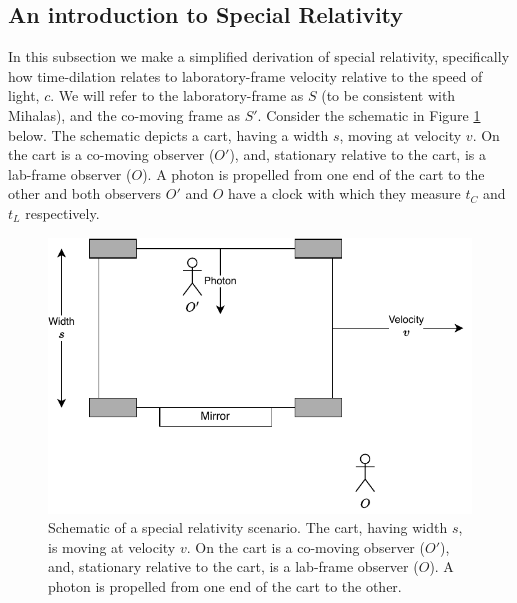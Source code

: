\documentclass[10pt,letterpaper,notitlepage]{article}
\numberwithin{equation}{section}
\begin{document}
\subsection{An introduction to Special Relativity}
In this subsection we make a simplified derivation of special relativity, specifically how time-dilation relates to laboratory-frame velocity relative to the speed of light, $c$. We will refer to the laboratory-frame as $S$ (to be consistent with Mihalas\cite{Mihalas}), and the co-moving frame as $S'$. Consider the schematic in Figure \ref{fig:relativitydiag1} below. The schematic depicts a cart, having a width $s$, moving at velocity $v$. On the cart is a co-moving observer ($O'$), and, stationary relative to the cart, is a lab-frame observer ($O$). A photon is propelled from one end of the cart to the other and both observers $O'$ and $O$ have a clock with which they measure $t_C$ and $t_L$ respectively.
\begin{figure}[H]
	\centering
	\includegraphics[width=0.7\linewidth]{figures/RelativityDiag1.drawio.pdf}
	\caption{Schematic of a special relativity scenario. The cart, having width $s$, is moving at velocity $v$. On the cart is a co-moving observer ($O'$), and, stationary relative to the cart, is a lab-frame observer ($O$). A photon is propelled from one end of the cart to the other.}
	\label{fig:relativitydiag1}
\end{figure}
\end{document}
